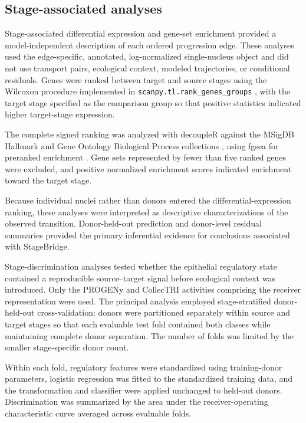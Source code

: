 \subsection{Stage-associated analyses}
\label{sec:methods-stage-transcriptomics}
\label{sec:methods-stage-discrimination}

Stage-associated differential expression and gene-set enrichment provided a
model-independent description of each ordered progression edge. These analyses
used the edge-specific, annotated, log-normalized single-nucleus object and did
not use transport pairs, ecological context, modeled trajectories, or
conditional residuals. Genes were ranked between target and source stages using
the Wilcoxon procedure implemented in
\texttt{scanpy.tl.rank\_genes\_groups}
\autocite{Wolf2018-rc}, with the target stage specified as the comparison
group so that positive statistics indicated higher target-stage expression.

The complete signed ranking was analyzed with decoupleR
\autocite{Badia-I-Mompel2022-te} against the MSigDB Hallmark and Gene Ontology
Biological Process collections
\autocite{Liberzon2015-cq}, using fgsea
for preranked enrichment \autocite{Korotkevich2016-ou}. Gene sets represented
by fewer than five ranked genes were excluded, and positive normalized
enrichment scores indicated enrichment toward the target stage.

Because individual nuclei rather than donors entered the differential-expression
ranking, these analyses were interpreted as descriptive characterizations of
the observed transition. Donor-held-out prediction and donor-level residual
summaries provided the primary inferential evidence for conclusions associated
with StageBridge.

Stage-discrimination analyses tested whether the epithelial regulatory state
contained a reproducible source--target signal before ecological context was
introduced. Only the PROGENy and CollecTRI activities comprising the receiver
representation were used. The principal analysis employed stage-stratified
donor-held-out cross-validation: donors were partitioned separately within
source and target stages so that each evaluable test fold contained both
classes while maintaining complete donor separation. The number of folds was
limited by the smaller stage-specific donor count.

Within each fold, regulatory features were standardized using training-donor
parameters, logistic regression was fitted to the standardized training data,
and the transformation and classifier were applied unchanged to held-out
donors. Discrimination was summarized by the area under the receiver-operating
characteristic curve averaged across evaluable folds.

